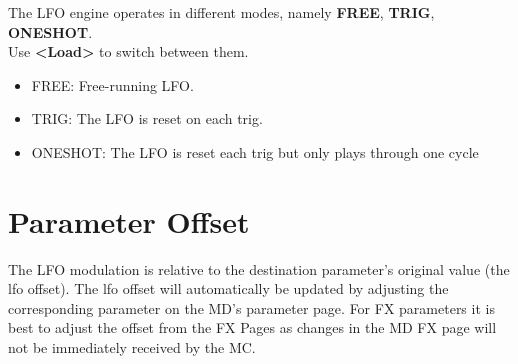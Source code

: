 The LFO engine operates in different modes, namely \textbf{FREE}, \textbf{TRIG}, \textbf{ONESHOT}.\\Use \textbf{<Load>} to switch between them.
\begin{itemize}
    \item FREE: Free-running LFO.
    \item TRIG: The LFO is reset on each trig.
    \item ONESHOT: The LFO is reset each trig but only plays through one cycle
\end{itemize}
\section{Parameter Offset}
The LFO modulation is relative to the destination parameter's original value (the lfo offset). The lfo offset will automatically be updated by adjusting the corresponding parameter on the MD's parameter page. For FX parameters it is best to adjust the offset from the FX Pages as changes in the MD FX page will not be immediately received by the MC.